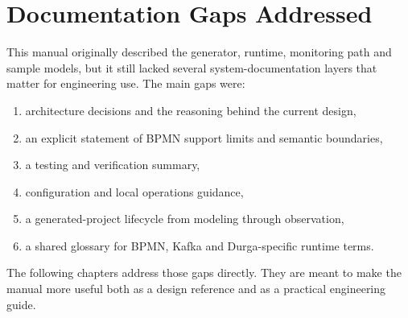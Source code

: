 \section{Documentation Gaps Addressed}
\label{sec:DocumentationGaps}

This manual originally described the generator, runtime, monitoring path and sample models,
but it still lacked several system-documentation layers that matter for engineering use.
The main gaps were:
\begin{enumerate}
\item architecture decisions and the reasoning behind the current design,
\item an explicit statement of BPMN support limits and semantic boundaries,
\item a testing and verification summary,
\item configuration and local operations guidance,
\item a generated-project lifecycle from modeling through observation,
\item a shared glossary for BPMN, Kafka and Durga-specific runtime terms.
\end{enumerate}

The following chapters address those gaps directly. They are meant to make the manual more
useful both as a design reference and as a practical engineering guide.
